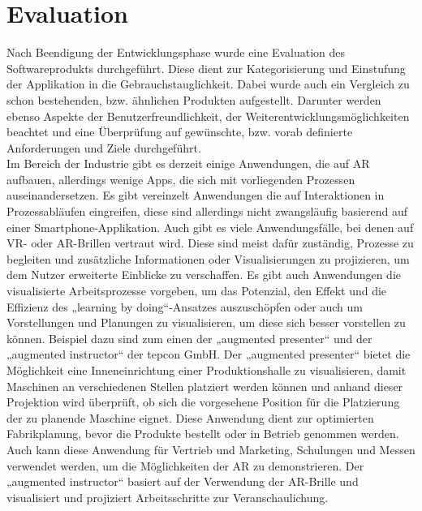 \chapter{Evaluation}
\label{chap:Evaluation}
Nach Beendigung der Entwicklungsphase wurde eine Evaluation des Softwareprodukts durchgeführt. Diese dient zur Kategorisierung und Einstufung der Applikation in 
die Gebrauchstauglichkeit. Dabei wurde auch ein Vergleich zu schon bestehenden, bzw. ähnlichen Produkten aufgestellt. Darunter werden 
ebenso Aspekte der Benutzerfreundlichkeit, der Weiterentwicklungsmöglichkeiten beachtet und eine Überprüfung auf gewünschte, bzw. vorab definierte Anforderungen 
und Ziele durchgeführt. 
\\ 
\linebreak
Im Bereich der Industrie gibt es derzeit einige Anwendungen, die auf \acl{AR} aufbauen, allerdings wenige Apps, die sich mit vorliegenden Prozessen 
auseinandersetzen. Es gibt vereinzelt Anwendungen die auf Interaktionen in Prozessabläufen eingreifen, diese sind allerdings nicht zwangsläufig basierend auf 
einer Smartphone-Applikation. Auch gibt es viele Anwendungsfälle, bei denen auf \acs{VR}- oder \acs{AR}-Brillen vertraut wird. Diese sind meist dafür zuständig, 
Prozesse zu begleiten und zusätzliche Informationen oder Visualisierungen zu projizieren, um dem Nutzer erweiterte Einblicke zu verschaffen. Es gibt auch 
Anwendungen die visualisierte Arbeitsprozesse vorgeben, um das Potenzial, den Effekt und die Effizienz des „learning by doing“-Ansatzes auszuschöpfen oder auch 
um Vorstellungen und Planungen zu visualisieren, um diese sich besser vorstellen zu können. Beispiel dazu sind zum einen der „augmented presenter“ \cite{tepcon.2020} 
und der „augmented instructor“ \cite{tepcon.2020} der tepcon GmbH. Der „augmented presenter“ bietet die Möglichkeit eine Inneneinrichtung einer Produktionshalle 
zu visualisieren, damit Maschinen an verschiedenen Stellen platziert werden können und anhand dieser Projektion wird überprüft, ob sich die vorgesehene Position 
für die Platzierung der zu planende Maschine eignet. Diese Anwendung dient zur optimierten Fabrikplanung, bevor die Produkte bestellt oder in Betrieb genommen 
werden. Auch kann diese Anwendung für Vertrieb und Marketing, Schulungen und Messen verwendet werden, um die Möglichkeiten der \acs{AR} zu demonstrieren. Der 
„augmented instructor“ basiert auf der Verwendung der \acs{AR}-Brille und visualisiert und projiziert Arbeitsschritte zur Veranschaulichung. 
\\ 
\linebreak
